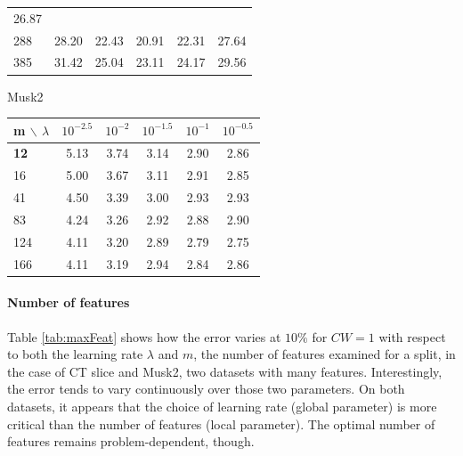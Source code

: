 \documentclass{article}
\begin{document}
\begin{table}[t]
\begin{center}
\begin{small}
\begin{tabular}{l|ccccc}
\cellcolor[gray]{0.61} 26.87 \\
288 & \cellcolor[gray]{0.55} 28.20 & \cellcolor[gray]{0.82} 22.43 & 
\cellcolor[gray]{0.89} 20.91 & \cellcolor[gray]{0.83} 22.31 & 
\cellcolor[gray]{0.58} 27.64 \\
385 & \cellcolor[gray]{0.40} 31.42 & \cellcolor[gray]{0.70} 25.04 & 
\cellcolor[gray]{0.79} 23.11 & \cellcolor[gray]{0.74} 24.17 & 
\cellcolor[gray]{0.49} 29.56 \\
\hline
\end{tabular}
\par
Musk2\\
\begin{tabular}{l|ccccc}
\hline
m $\backslash$ $\lambda$  &  $10^{-2.5}$ & $10^{-2}$ & $10^{-1.5}$ & 
$10^{-1}$ & $10^{-0.5}$ \\
\hline
{\bf 12} & \cellcolor[gray]{0.40} 5.13 & \cellcolor[gray]{0.75} 3.74 & 
\cellcolor[gray]{0.90} 3.14 & \cellcolor[gray]{0.96} 2.90 & 
\cellcolor[gray]{0.97} 2.86 \\
16 & \cellcolor[gray]{0.43} 5.00 & \cellcolor[gray]{0.77} 3.67 & 
\cellcolor[gray]{0.91} 3.11 & \cellcolor[gray]{0.96} 2.91 & 
\cellcolor[gray]{0.97} 2.85 \\
41 & \cellcolor[gray]{0.56} 4.50 & \cellcolor[gray]{0.84} 3.39 & 
\cellcolor[gray]{0.94} 3.00 & \cellcolor[gray]{0.95} 2.93 & 
\cellcolor[gray]{0.96} 2.93 \\
83 & \cellcolor[gray]{0.62} 4.24 & \cellcolor[gray]{0.87} 3.26 & 
\cellcolor[gray]{0.96} 2.92 & \cellcolor[gray]{0.97} 2.88 & 
\cellcolor[gray]{0.96} 2.90 \\
124 & \cellcolor[gray]{0.66} 4.11 & \cellcolor[gray]{0.89} 3.20 & 
\cellcolor[gray]{0.96} 2.89 & \cellcolor[gray]{0.99} 2.79 & 
\cellcolor[gray]{1.00} 2.75 \\
166 & \cellcolor[gray]{0.66} 4.11 & \cellcolor[gray]{0.89} 3.19 & 
\cellcolor[gray]{0.95} 2.94 & \cellcolor[gray]{0.98} 2.84 & 
\cellcolor[gray]{0.97} 2.86 \\
\hline
\end{tabular}
\end{small}
\end{center}
\vskip -0.1in
\end{table}

\paragraph{Number of features}
Table \ref{tab:maxFeat} shows how the error varies at $10\%$ for $CW=1$ with 
respect to both the learning rate $\lambda$ and $m$, the number of features 
examined for a split, in the case of CT slice and Musk2, two datasets with many 
features.
Interestingly, the error tends to vary continuously over those two parameters. 
On both datasets, it appears that the choice of learning rate (global 
parameter) is more critical than the number of features (local parameter). The 
optimal number of features remains problem-dependent, though. 
\end{document}

